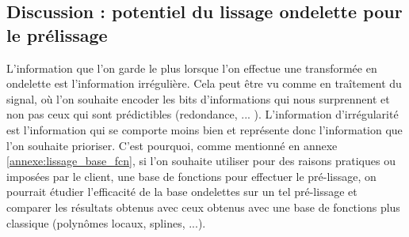 \subsection{Discussion : potentiel du lissage ondelette pour le prélissage}

L'information que \og l'on garde le plus \fg lorsque l'on effectue une transformée en ondelette est l'information irrégulière. Cela peut être vu comme en traîtement du signal, où l'on souhaite encoder les bits d'informations qui \og nous surprennent \fg et non pas ceux qui sont prédictibles (redondance, ... ). L'information d'irrégularité est l'information qui se \og comporte moins bien \fg et représente donc l'information que l'on souhaite prioriser. C'est pourquoi, comme mentionné en annexe \ref{annexe:lissage_base_fcn}, si l'on souhaite utiliser pour des raisons pratiques ou imposées par le client, une base de fonctions pour effectuer le pré-lissage, on pourrait étudier l'efficacité de la base ondelettes sur un tel pré-lissage et comparer les résultats obtenus avec ceux obtenus avec une base de fonctions plus classique (polynômes locaux, splines, ...).